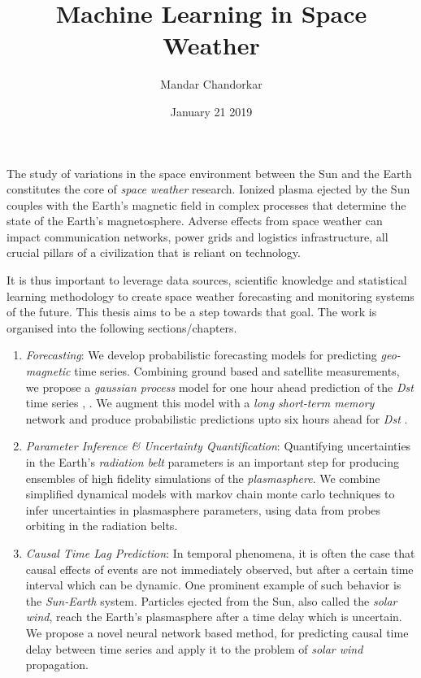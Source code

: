 \documentclass[10pt]{article}
\title{Machine Learning in Space Weather}
\author{Mandar Chandorkar}
\date{January 21 2019}
\begin{document}
\maketitle

The study of variations in the space environment between the Sun and the Earth constitutes the core of \textit{space weather} research. Ionized plasma ejected by the Sun couples with the Earth’s magnetic field in complex processes that determine the state of the Earth's magnetosphere. Adverse effects from space weather can impact communication networks, power grids and logistics infrastructure, all crucial pillars of a civilization that is reliant on technology.

It is thus important to leverage data sources, scientific knowledge and statistical learning methodology to create space weather forecasting and monitoring systems of the future. This thesis aims to be a step towards that goal. The work is organised into the following sections/chapters.

\begin{enumerate}
\item \textit{Forecasting}: We develop probabilistic forecasting models for predicting \textit{geo-magnetic} time series. Combining ground based and satellite measurements, we propose a \textit{gaussian process} model for one hour ahead prediction of the \textit{Dst} time series \cite{ChandorkarDst}, \cite{CHANDORKAR2018237}. We augment this model with a \textit{long short-term memory} network and produce probabilistic predictions upto six hours ahead for \textit{Dst} \cite{doi:10.1029/2018SW001898}.

\item \textit{Parameter Inference \& Uncertainty Quantification}: Quantifying uncertainties in the Earth's \textit{radiation belt} parameters is an important step for producing ensembles of high fidelity simulations of the \textit{plasmasphere}. We combine simplified dynamical models with markov chain monte carlo techniques to infer uncertainties in plasmasphere parameters, using data from probes orbiting in the radiation belts.

\item \textit{Causal Time Lag Prediction}: In temporal phenomena, it is often the case that causal effects of events are not immediately observed, but after a certain time interval which can be dynamic. One prominent example of such behavior is the \textit{Sun-Earth} system. Particles ejected from the Sun, also called the \textit{solar wind}, reach the Earth's plasmasphere after a time delay which is uncertain. We propose a novel neural network based method, for predicting causal time delay between time series and apply it to the problem of \textit{solar wind} propagation.



\end{enumerate}






\end{document}
